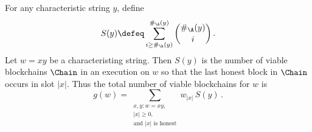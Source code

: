 For any characteristic string $y$, define 
\begin{equation}\label{eq:S_y}
    S(y) 
    \defeq \sum_{i \geq \#_\h(y)}^{\#_\A(y)}{ \binom{\#_\A(y)}{i} } 
    \,.
\end{equation}
Let $w = xy$ be a characteristing string. 
Then $S(y)$ is the number of viable blockchains $\Chain$
in an execution on $w$ 
so that the last honest block in $\Chain$ occurs in slot $|x|$. 
Thus the total number of viable blockchains for $w$ is 
\begin{equation}\label{eq:g_praos}
    g(w) 
    = \sum_{\substack{x,y : w = xy, \\ |x| \geq 0, \\ \text{and $|x|$ is honest} }} w_{|x|}\, S(y)
    \,.  
\end{equation}

